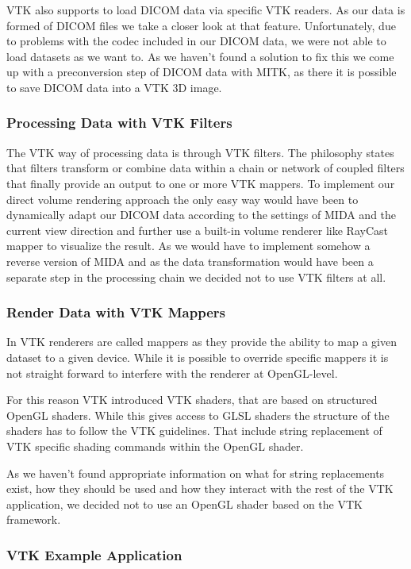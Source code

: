 VTK also supports to load DICOM data via specific VTK readers. As our data is formed of DICOM files we take a closer look at that feature. Unfortunately, due to problems with the codec included in our DICOM data, we were not able to load datasets as we want to. As we haven't found a solution to fix this we come up with a preconversion step of DICOM data with MITK, as there it is possible to save DICOM data into a VTK 3D image.  


\subsubsection{Processing Data with VTK Filters}

The VTK way of processing data is through VTK filters. The philosophy states that filters transform or combine data within a chain or network of coupled filters that finally provide an output to one or more VTK mappers.
To implement our direct volume rendering approach the only easy way would have been to dynamically adapt our DICOM data according to the settings of MIDA and the current view direction and further use a built-in volume renderer like RayCast mapper to visualize the result.
As we would have to implement somehow a reverse version of MIDA and as the data transformation would have been a separate step in the processing chain we decided not to use VTK filters at all.

\subsubsection{Render Data with VTK Mappers}

In VTK renderers are called mappers as they provide the ability to map a given dataset to a given device. While it is possible to override specific mappers it is not straight forward to interfere with the renderer at OpenGL-level. 

For this reason VTK introduced VTK shaders, that are based on structured OpenGL shaders. While this gives access to GLSL shaders the structure of the shaders has to follow the VTK guidelines. That include string replacement of VTK specific shading commands within the OpenGL shader.

As we haven't found appropriate information on what for string replacements exist, how they should be used and how they interact with the rest of the VTK application, we decided not to use an OpenGL shader based on the VTK framework.

\subsubsection{VTK Example Application}

